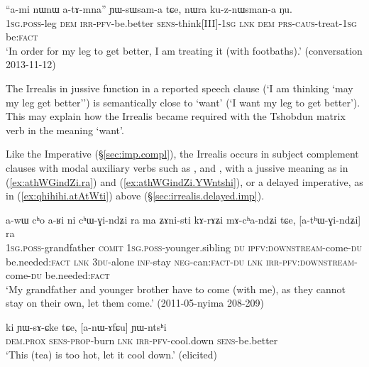 \begin{exe}
\ex \label{ex:atAmna.YWsWsama}
\gll  ``a-mi nɯnɯ a-tɤ-mna'' ɲɯ-sɯsam-a tɕe, nɯra ku-z-nɯsman-a ŋu. \\
\textsc{1sg}.\textsc{poss}-leg \textsc{dem} \textsc{irr}-\textsc{pfv}-be.better \textsc{sens}-think[III]-\textsc{1sg} \textsc{lnk} \textsc{dem} \textsc{prs}-\textsc{caus}-treat-\textsc{1sg} be:\textsc{fact} \\
\glt `In order for my leg to get better, I am treating it (with footbaths).' (conversation 2013-11-12)
\end{exe}

The Irrealis in jussive function in a reported speech clause (`I am thinking `may my leg get better'') is semantically close to `want' (`I want my leg to get better'). This may explain how the Irrealis became required with the Tshobdun matrix verb  in the meaning `want'. 


Like the Imperative (§\ref{sec:imp.compl}), the Irrealis occurs in subject complement clauses with modal auxiliary verbs such as ,  and , with a jussive meaning as in (\ref{ex:athWGindZi.ra}) and (\ref{ex:athWGindZi.YWntshi}), or a delayed imperative, as in (\ref{ex:qhihihi.atAtWti}) above (§\ref{sec:irrealis.delayed.imp}).

\begin{exe}
\ex \label{ex:athWGindZi.ra}
\gll a-wɯ cʰo a-ʁi ni cʰɯ-ɣi-ndʑi ra ma  ʑɤni-sti kɤ-rɤʑi mɤ-cʰa-ndʑi tɕe, [a-tʰɯ-ɣi-ndʑi] ra \\
\textsc{1sg}.\textsc{poss}-grandfather \textsc{comit} \textsc{1sg}.\textsc{poss}-younger.sibling \textsc{du} \textsc{ipfv}:\textsc{downstream}-come-\textsc{du} be.needed:\textsc{fact} \textsc{lnk} \textsc{3du}-alone \textsc{inf}-stay \textsc{neg}-can:\textsc{fact}-\textsc{du} \textsc{lnk} \textsc{irr}-\textsc{pfv}:\textsc{downstream}-come-\textsc{du} be.needed:\textsc{fact} \\
\glt `My grandfather and younger brother have to come (with me), as they cannot stay on their own, let them come.' (2011-05-nyima 208-209)
\end{exe}

\begin{exe}
\ex \label{ex:athWGindZi.YWntshi}
\gll ki ɲɯ-sɤ-ɕke tɕe, [a-nɯ-ɤfɕu] ɲɯ-ntsʰi \\
\textsc{dem}.\textsc{prox} \textsc{sens}-\textsc{prop}-burn \textsc{lnk} \textsc{irr}-\textsc{pfv}-cool.down \textsc{sens}-be.better \\
\glt `This (tea) is too hot, let it cool down.' (elicited)
\end{exe}

